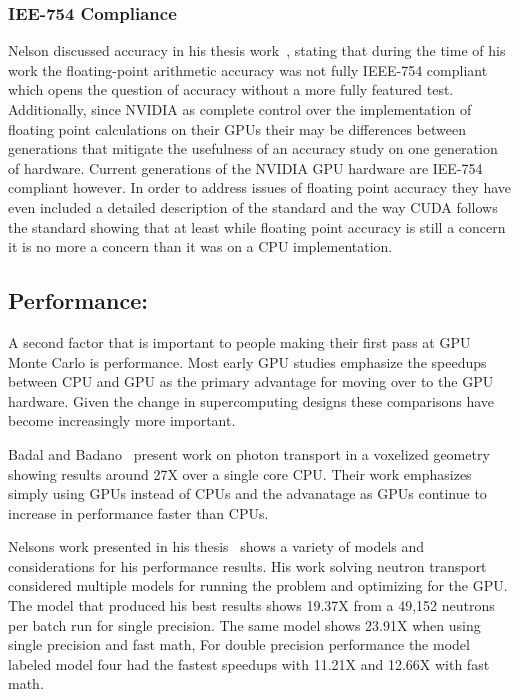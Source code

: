 \subsubsection*{ \textbf{IEE-754 Compliance} }
Nelson discussed accuracy in his thesis work~\cite{nelson2009monte}, stating that during the time of his work the floating-point arithmetic accuracy was not fully IEEE-754 compliant which opens the question of accuracy without a more fully featured test. 
%
Additionally, since NVIDIA as complete control over the implementation of floating point calculations on their GPUs their may be differences between generations that mitigate the usefulness of an accuracy study on one generation of hardware.
%
Current generations of the NVIDIA GPU hardware are IEE-754 compliant however. 
%
In order to address issues of floating point accuracy they have even included a detailed description of the standard and the way CUDA follows the standard showing that at least while floating point accuracy is still a concern it is no more a concern than it was on a CPU implementation.~\cite{cudaToolkitv7.5}
%

\subsection*{Performance:}

A second factor that is important to people making their first pass at GPU Monte Carlo is performance.
%
Most early GPU studies emphasize the speedups between CPU and GPU as the primary advantage for moving over to the GPU hardware.
%
Given the change in supercomputing designs these comparisons have become increasingly more important.
%

Badal and Badano~\cite{badal2009accelerating} present work on photon transport in a voxelized geometry showing results around 27X over a single core CPU.
%
Their work emphasizes simply using GPUs instead of CPUs and the advanatage as GPUs continue to increase in performance faster than CPUs.
%

Nelsons work presented in his thesis~\cite{nelson2009monte} shows a variety of models and considerations for his performance results.
%
His work solving neutron transport considered multiple models for running the problem and optimizing for the GPU.
%
The model that produced his best results shows 19.37X from a 49,152 neutrons per batch run for single precision.
%
The same model shows 23.91X when using single precision and fast math,
%
For double precision performance the model labeled model four had the fastest speedups with 11.21X and 12.66X with fast math.

